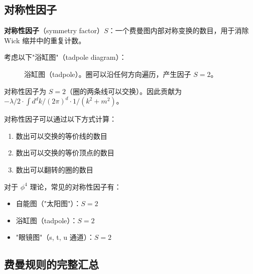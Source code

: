 
\subsection{对称性因子}

\begin{definition}[对称性因子]
\textbf{对称性因子}（symmetry factor）$S$：一个费曼图内部对称变换的数目，用于消除 Wick 缩并中的重复计数。
\end{definition}

\begin{example}[对称性因子的计算]
考虑以下"浴缸图"（tadpole diagram）：
\begin{figure}[htbp]
\centering
{}
\caption{浴缸图（tadpole）。圈可以沿任何方向遍历，产生因子 $S=2$。}
\label{fig:tadpole}
\end{figure}

对称性因子为 $S=2$（圈的两条线可以交换）。因此贡献为 $-\lambda/2 \cdot \int d^d k/(2\pi)^d \cdot 1/(k^2+m^2)$。
\end{example}

\begin{property}[对称性因子的计算规则]
对称性因子可以通过以下方式计算：
\begin{enumerate}
    \item 数出可以交换的等价线的数目
    \item 数出可以交换的等价顶点的数目
    \item 数出可以翻转的圈的数目
\end{enumerate}
对于 $\phi^4$ 理论，常见的对称性因子有：
\begin{itemize}
    \item 自能图（"太阳图"）：$S = 2$
    \item 浴缸图（tadpole）：$S = 2$
    \item "眼镜图"（s, t, u 通道）：$S = 2$
\end{itemize}
\end{property}


\subsection{费曼规则的完整汇总}

